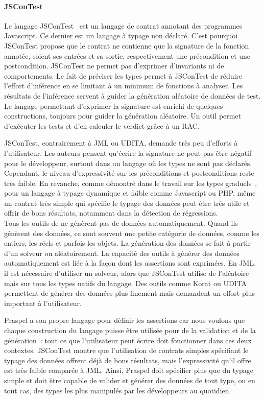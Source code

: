 \paragraph{JSConTest} Le langage JSConTest~ est un langage
de contrat annotant des programmes Javascript. Ce dernier est un langage à
typage non déclaré. C'est pourquoi JSConTest propose que le contrat ne contienne
que la signature de la fonction annotée, soient ses entrées et sa sortie,
respectivement une précondition et une postcondition. JSConTest ne permet pas
d'exprimer d'invariants ni de comportements. Le fait de préciser les types
permet à JSConTest de réduire l'effort d'inférence en se limitant à un minimum
de fonctions à analyser. Les résultats de l'inférence servent à guider la
génération aléatoire de données de test. Le langage permettant d'exprimer la
signature est enrichi de quelques constructions, toujours pour guider la
génération aléatoire. Un outil permet d'exécuter les tests et d'en calculer le
verdict grâce à un RAC.

JSConTest, contrairement à JML ou UDITA, demande très peu d'efforts à
l'utilisateur. Les auteurs pensent qu'écrire la signature ne peut pas être
négatif pour le développeur, surtout dans un langage où les types ne sont pas
déclarés. Cependant, le niveau d'expressivité sur les préconditions et
postconditions reste très faible. En revanche, comme démontré dans le travail
sur les types graduels~, pour un langage à typage dynamique et
faible comme Javascript ou PHP, même un contrat très simple qui spécifie le
typage des données peut être très utile et offrir de bons résultats, notamment
dans la détection de régressions. \\

Tous les outils de  ne génèrent pas de données
automatiquement. Quand ils génèrent des données, ce sont souvent une petite
catégorie de données, comme les entiers, les réels et parfois les objets. La
génération des données se fait à partir d'un solveur ou aléatoirement. La
capacité des outils à générer des données automatiquement est liée à la façon
dont les assertions sont exprimées. En JML, il est nécessaire d'utiliser un
solveur, alors que JSConTest utilise de l'aléatoire mais sur tous les types
natifs du langage. Des outils comme Korat ou UDITA permettent de générer des
données plus finement mais demandent un effort plus important à l'utilisateur.

Praspel a son propre langage pour définir les assertions car nous voulons que
chaque construction du langage puisse être utilisée pour de la validation
{\strong et} de la génération~: tout ce que l'utilisateur peut écrire doit
fonctionner dans ces deux contextes. JSConTest montre que l'utilisation de
contrats simples spécifiant le typage des données offrent déjà de bons
résultats, mais l'expressivité qu'il offre est très faible comparée à JML.
Ainsi, Praspel doit spécifier plus que du typage simple et doit être capable de
valider et générer des données de tout type, ou en tout cas, des types les plus
manipulés par les développeurs au quotidien.
